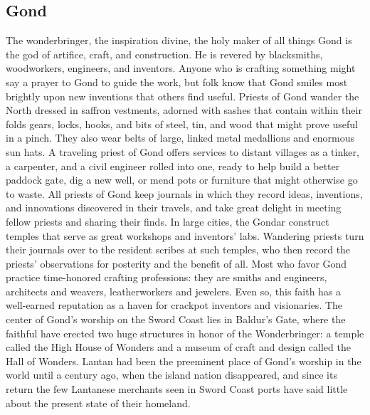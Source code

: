 \documentclass[10pt,a4paper,twoside,twocolumn,openany,bg=print,nodeprecatedcode]{dndbook}
\begin{document}
\subsection{Gond}
The wonderbringer, the inspiration divine, the holy maker of all things
Gond is the god of artifice, craft, and construction. He is revered by blacksmiths, woodworkers, engineers, and inventors. Anyone who is crafting something might say a prayer to Gond to guide the work, but folk know that Gond smiles most brightly upon new inventions that others find useful.
Priests of Gond wander the North dressed in saffron vestments, adorned with sashes that contain within their folds gears, locks, hooks, and bits of steel, tin, and wood that might prove useful in a pinch. They also wear belts of large, linked metal medallions and enormous sun hats. A traveling priest of Gond offers services to distant villages as a tinker, a carpenter, and a civil engineer rolled into one, ready to help build a better paddock gate, dig a new well, or mend pots or furniture that might otherwise go to waste. All priests of Gond keep journals in which they record ideas, inventions, and innovations discovered in their travels, and take great delight in meeting fellow priests and sharing their finds. In large cities, the Gondar construct temples that serve as great workshops and inventors' labs. Wandering priests turn their journals over to the resident scribes at such temples, who then record the priests' observations for posterity and the benefit of all.
Most who favor Gond practice time-honored crafting professions: they are smiths and engineers, architects and weavers, leatherworkers and jewelers. Even so, this faith has a well-earned reputation as a haven for crackpot inventors and visionaries.
The center of Gond's worship on the Sword Coast lies in Baldur's Gate, where the faithful have erected two huge structures in honor of the Wonderbringer: a temple called the High House of Wonders and a museum of craft and design called the Hall of Wonders. Lantan had been the preeminent place of Gond's worship in the world until a century ago, when the island nation disappeared, and since its return the few Lantanese merchants seen in Sword Coast ports have said little about the present state of their homeland.
\end{document}
